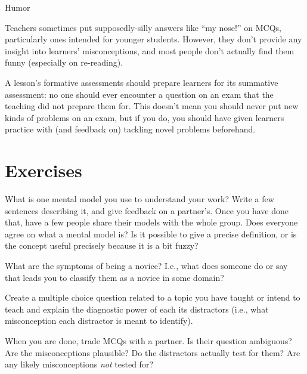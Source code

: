 \begin{callout}{Humor}

  Teachers sometimes put supposedly-silly answers like ``my nose!''
  on MCQs, particularly ones intended for younger students. However,
  they don't provide any insight into learners' misconceptions, and
  most people don't actually find them funny (especially on
  re-reading).

\end{callout}

A lesson's formative assessments should prepare learners for its
summative assessment: no one should ever encounter a question on an
exam that the teaching did not prepare them for. This doesn't mean you
should never put new kinds of problems on an exam, but if you do, you
should have given learners practice with (and feedback on) tackling
novel problems beforehand.

\section{Exercises}\label{s:models-exercises}


What is one mental model you use to understand your work?  Write a few
sentences describing it, and give feedback on a partner's.  Once you
have done that, have a few people share their models with the whole
group.  Does everyone agree on what a mental model is?  Is it possible
to give a precise definition, or is the concept useful precisely
because it is a bit fuzzy?


What are the symptoms of being a novice? I.e., what does someone do or
say that leads you to classify them as a novice in some domain?


Create a multiple choice question related to a topic you have taught
or intend to teach and explain the diagnostic power of each its
distractors (i.e., what misconception each distractor is meant to
identify).

When you are done, trade MCQs with a partner.  Is their question
ambiguous?  Are the misconceptions plausible?  Do the distractors
actually test for them?  Are any likely misconceptions \emph{not}
tested for?


